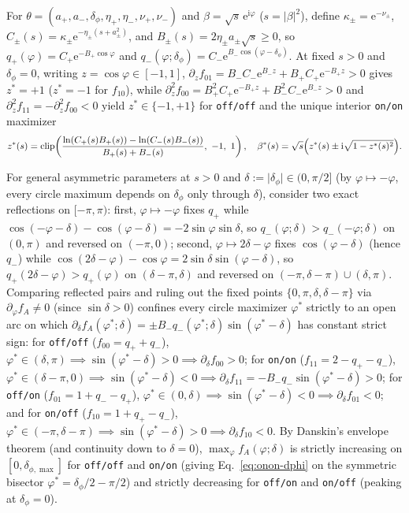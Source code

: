\documentclass{iopjournal}
\newcommand{\clip}{\operatorname{clip}}
\newcommand{\abs}[1]{\lvert #1\rvert}
\newcommand{\ii}{\mathrm{i}}
\newcommand{\ee}{\mathrm{e}}
\begin{document}
For $\theta = (a_+, a_-, \delta_\phi, \eta_+, \eta_-, \nu_+, \nu_-)$ and $\beta = \sqrt{s}\,\ee^{\ii\varphi}$ ($s = \abs{\beta}^2$), define $\kappa_\pm = \ee^{-\nu_\pm}$, $C_\pm(s) = \kappa_\pm\ee^{-\eta_\pm(s+a_\pm^2)}$, and $B_\pm(s) = 2\eta_\pm a_\pm\sqrt{s} \ge 0$, so $q_+(\varphi) = C_+\ee^{-B_+\cos\varphi}$ and $q_-(\varphi;\delta_\phi) = C_-\ee^{B_-\cos(\varphi-\delta_\phi)}$. At fixed $s > 0$ and $\delta_\phi = 0$, writing $z = \cos\varphi \in [-1,1]$, $\partial_z f_{01} = B_- C_-\ee^{B_- z} + B_+ C_+\ee^{-B_+ z} > 0$ gives $z^* = +1$ ($z^* = -1$ for $f_{10}$), while $\partial_z^2 f_{00} = B_+^2 C_+\ee^{-B_+ z} + B_-^2 C_-\ee^{B_- z} > 0$ and $\partial_z^2 f_{11} = -\partial_z^2 f_{00} < 0$ yield $z^* \in \{-1,+1\}$ for \texttt{off/off} and the unique interior \texttt{on/on} maximizer
\begin{equation}\label{eq:zstar-onon}
z^*(s) = \clip\!\left(\frac{\ln(C_+(s) B_+(s)) - \ln(C_-(s) B_-(s))}{B_+(s) + B_-(s)},\ -1,\ 1\right), \quad
\beta^*(s) = \sqrt{s}\Bigl(z^*(s) \pm \ii\sqrt{1-z^*(s)^2}\Bigr).
\end{equation}

For general asymmetric parameters at $s > 0$ and $\delta := \abs{\delta_\phi} \in (0, \pi/2]$ (by $\varphi \mapsto -\varphi$, every circle maximum depends on $\delta_\phi$ only through $\delta$), consider two exact reflections on $[-\pi,\pi)$: first, $\varphi \mapsto -\varphi$ fixes $q_+$ while $\cos(-\varphi-\delta)-\cos(\varphi-\delta) = -2\sin\varphi\sin\delta$, so $q_-(\varphi;\delta) > q_-(-\varphi;\delta)$ on $(0,\pi)$ and reversed on $(-\pi,0)$; second, $\varphi \mapsto 2\delta-\varphi$ fixes $\cos(\varphi-\delta)$ (hence $q_-$) while $\cos(2\delta-\varphi)-\cos\varphi = 2\sin\delta\sin(\varphi-\delta)$, so $q_+(2\delta-\varphi) > q_+(\varphi)$ on $(\delta-\pi,\delta)$ and reversed on $(-\pi,\delta-\pi)\cup(\delta,\pi)$. Comparing reflected pairs and ruling out the fixed points $\{0,\pi,\delta,\delta-\pi\}$ via $\partial_\varphi f_A \neq 0$ (since $\sin\delta > 0$) confines every circle maximizer $\varphi^*$ strictly to an open arc on which $\partial_\delta f_A(\varphi^*;\delta) = \pm B_- q_-(\varphi^*;\delta)\sin(\varphi^*-\delta)$ has constant strict sign: for \texttt{off/off} ($f_{00} = q_+ + q_-$), $\varphi^* \in (\delta,\pi) \implies \sin(\varphi^*-\delta) > 0 \implies \partial_\delta f_{00} > 0$; for \texttt{on/on} ($f_{11} = 2 - q_+ - q_-$), $\varphi^* \in (\delta-\pi,0) \implies \sin(\varphi^*-\delta) < 0 \implies \partial_\delta f_{11} = -B_- q_-\sin(\varphi^*-\delta) > 0$; for \texttt{off/on} ($f_{01} = 1 + q_- - q_+$), $\varphi^* \in (0,\delta) \implies \sin(\varphi^*-\delta) < 0 \implies \partial_\delta f_{01} < 0$; and for \texttt{on/off} ($f_{10} = 1 + q_+ - q_-$), $\varphi^* \in (-\pi,\delta-\pi) \implies \sin(\varphi^*-\delta) > 0 \implies \partial_\delta f_{10} < 0$. By Danskin's envelope theorem (and continuity down to $\delta = 0$), $\max_\varphi f_A(\varphi;\delta)$ is strictly increasing on $[0,\delta_{\phi,\max}]$ for \texttt{off/off} and \texttt{on/on} (giving Eq.~\eqref{eq:onon-dphi} on the symmetric bisector $\varphi^* = \delta_\phi/2 - \pi/2$) and strictly decreasing for \texttt{off/on} and \texttt{on/off} (peaking at $\delta_\phi = 0$).
\end{document}
